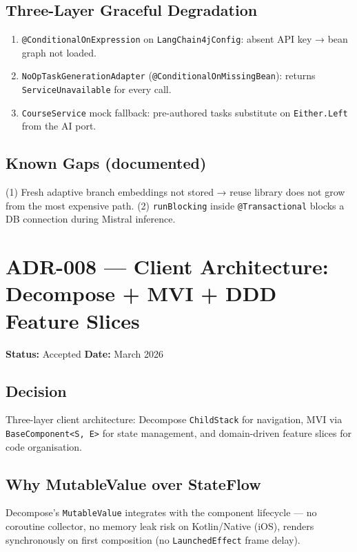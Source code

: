 \subsection*{Three-Layer Graceful Degradation}
\begin{enumerate}
    \item \texttt{@ConditionalOnExpression} on \texttt{LangChain4jConfig}: absent API key → bean graph not loaded.
    \item \texttt{NoOpTaskGenerationAdapter} (\texttt{@ConditionalOnMissingBean}): returns \texttt{ServiceUnavailable} for every call.
    \item \texttt{CourseService} mock fallback: pre-authored tasks substitute on \texttt{Either.Left} from the AI port.
\end{enumerate}

\subsection*{Known Gaps (documented)}
(1) Fresh adaptive branch embeddings not stored → reuse library does not grow from the most expensive path. (2) \texttt{runBlocking} inside \texttt{@Transactional} blocks a DB connection during Mistral inference.

\section{ADR-008 — Client Architecture: Decompose + MVI + DDD Feature Slices}
\label{adr:008}
\textbf{Status:} Accepted \quad \textbf{Date:} March 2026

\subsection*{Decision}
Three-layer client architecture: Decompose \texttt{ChildStack} for navigation, MVI via \texttt{BaseComponent<S, E>} for state management, and domain-driven feature slices for code organisation.

\subsection*{Why MutableValue over StateFlow}
Decompose's \texttt{MutableValue} integrates with the component lifecycle — no coroutine collector, no memory leak risk on Kotlin/Native (iOS), renders synchronously on first composition (no \texttt{LaunchedEffect} frame delay).

